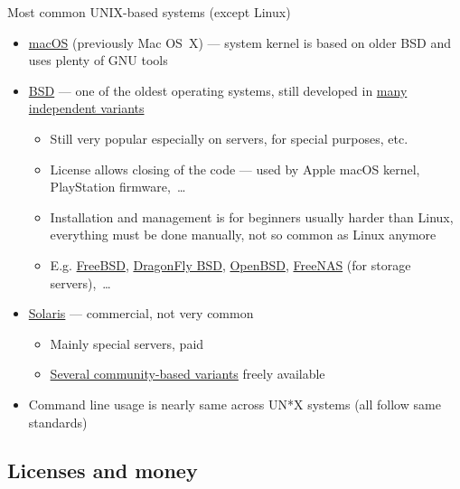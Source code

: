 \documentclass[compress, ucs, xelatex, 11pt, xcolor=svgnames,
  hyperref={
    bookmarks=true,
    unicode=true,
    colorlinks=true,
    pdftitle={Linux, command line and MetaCentrum},
    plainpages=false,
    pdfauthor={Vojtech Zeisek},
    pdfsubject={Course about use of Linux command line, writing shell scripts and using MetaCentrum of CESNET},
    pdfcreator={XeLaTeX},
    pdfkeywords={Linux, GNU, BASH, shell, command line, MetaCentrum},
    linkcolor=DarkRed,
    anchorcolor=DarkBlue,
    citecolor=Indigo,
    filecolor=NavyBlue,
    menucolor=DarkMagenta,
    urlcolor=DarkBlue,
    pdftex},
  url={hyphens, lowtilde} %
  ]{beamer}
\begin{document}
\begin{frame}{Most common UNIX-based systems (except Linux)}
  \begin{itemize}
    \item \href{https://en.wikipedia.org/wiki/MacOS}{macOS} (previously Mac OS~X) --- system kernel is based on older BSD and uses plenty of GNU tools
    \item \href{https://en.wikipedia.org/wiki/Berkeley_Software_Distribution}{BSD} --- one of the oldest operating systems, still developed in \href{https://distrowatch.com/search.php?ostype=BSD}{many independent variants}
    \begin{itemize}
      \item Still very popular especially on servers, for special purposes, etc.
      \item License allows closing of the code --- used by Apple macOS kernel, PlayStation firmware,~\ldots
      \item Installation and management is for beginners usually harder than Linux, everything must be done manually, not so common as Linux anymore
      \item E.g. \href{https://www.freebsd.org/}{FreeBSD}, \href{https://www.dragonflybsd.org/}{DragonFly BSD}, \href{https://www.openbsd.org/}{OpenBSD}, \href{http://www.freenas.org/}{FreeNAS} (for storage servers),~\ldots
    \end{itemize}
    \item \href{https://en.wikipedia.org/wiki/Solaris_(operating_system)}{Solaris} --- commercial, not very common
    \begin{itemize}
      \item Mainly special servers, paid
      \item \href{https://distrowatch.com/search.php?ostype=Solaris}{Several community-based variants} freely available
    \end{itemize}
    \item Command line usage is nearly same across UN*X systems (all follow same standards)
  \end{itemize}
\end{frame}

\subsection{Licenses and money}
\end{document}
